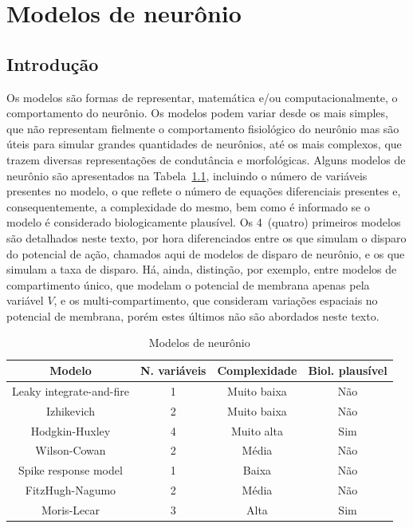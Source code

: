 \chapter{Modelos de neurônio}\label{cap:modelos}
\section{Introdução}\label{sec:modelos_intro}
Os modelos são formas de representar, matemática e/ou computacionalmente, o comportamento do neurônio. Os modelos podem variar desde os mais simples, que não representam fielmente o comportamento fisiológico do neurônio mas são úteis para simular grandes quantidades de neurônios, até os mais complexos, que trazem diversas representações de condutância e morfológicas. Alguns modelos de neurônio são apresentados na Tabela~\ref{tab:modelos_neuronios}, incluindo o número de variáveis presentes no modelo, o que reflete o número de equações diferenciais presentes e, consequentemente, a complexidade do mesmo, bem como é informado se o modelo é considerado biologicamente plausível. Os 4~(quatro) primeiros modelos são detalhados neste texto, por hora diferenciados entre os que simulam o disparo do potencial de ação, chamados aqui de modelos de disparo de neurônio, e os que simulam a taxa de disparo. Há, ainda, distinção, por exemplo, entre modelos de compartimento único, que modelam o potencial de membrana apenas pela variável $V$, e os multi-compartimento, que consideram variações espaciais no potencial de membrana, porém estes últimos não são abordados neste texto.

\begin{table}
	\centering
	\caption[Modelos de neurônio]{Modelos de neurônio}
	\label{tab:modelos_neuronios}
	\begin{tabular}{|c|c|c|c|}
		\hline
		Modelo & N. variáveis & Complexidade & Biol. plausível \\
		\hline
		Leaky integrate-and-fire & 1 & Muito baixa & Não \\
		\hline
		Izhikevich & 2 & Muito baixa & Não \\
		\hline
		Hodgkin-Huxley & 4 & Muito alta & Sim \\
		\hline
		Wilson-Cowan & 2 & Média & Não \\
		\hline
		Spike response model & 1 & Baixa & Não \\
		\hline
		FitzHugh-Nagumo & 2 & Média & Não \\
		\hline
		Moris-Lecar & 3 & Alta & Sim \\
		\hline
	\end{tabular}
\end{table}


